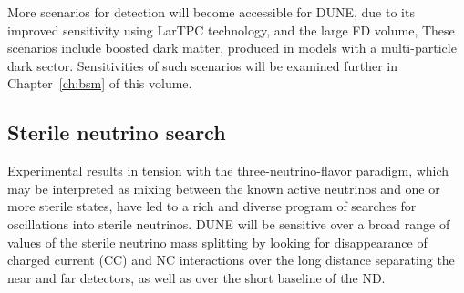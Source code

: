 More scenarios for  detection will become accessible for DUNE, due to its improved sensitivity
using LarTPC technology, and the large FD volume, These scenarios include boosted dark matter, 
produced in models with 
a multi-particle dark sector. Sensitivities of such scenarios will be 
examined further in Chapter~\ref{ch:bsm} of this volume.


\subsection{Sterile neutrino search}
 Experimental results in tension with the three-neutrino-flavor paradigm, which may be interpreted
 as mixing between the known active neutrinos and one or more sterile states, have led to a rich
 and diverse program of searches for oscillations into sterile neutrinos. DUNE will be sensitive over a
 broad range of values of the sterile neutrino mass splitting by looking for disappearance of charged
 current (CC) and NC interactions over the long distance separating the near and far detectors,
 as well as over the short baseline of the ND. 

